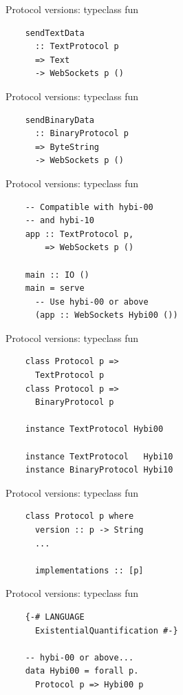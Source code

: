 \documentclass[20pt]{beamer}
\begin{document}
\begin{frame}[fragile]{Protocol versions: typeclass fun}
    \begin{lstlisting}
    sendTextData
      :: TextProtocol p
      => Text
      -> WebSockets p ()
    \end{lstlisting}
\end{frame}

\begin{frame}[fragile]{Protocol versions: typeclass fun}
    \begin{lstlisting}
    sendBinaryData
      :: BinaryProtocol p
      => ByteString
      -> WebSockets p ()
    \end{lstlisting}
\end{frame}

\begin{frame}[fragile]{Protocol versions: typeclass fun}
    \begin{lstlisting}
    -- Compatible with hybi-00
    -- and hybi-10
    app :: TextProtocol p,
        => WebSockets p ()

    main :: IO ()
    main = serve
      -- Use hybi-00 or above
      (app :: WebSockets Hybi00 ())
    \end{lstlisting}
\end{frame}

\begin{frame}[fragile]{Protocol versions: typeclass fun}
    \begin{lstlisting}
    class Protocol p =>
      TextProtocol p
    class Protocol p =>
      BinaryProtocol p

    instance TextProtocol Hybi00

    instance TextProtocol   Hybi10
    instance BinaryProtocol Hybi10
    \end{lstlisting}
\end{frame}

\begin{frame}[fragile]{Protocol versions: typeclass fun}
    \begin{lstlisting}
    class Protocol p where
      version :: p -> String
      ...

      implementations :: [p]
    \end{lstlisting}
\end{frame}

\begin{frame}[fragile]{Protocol versions: typeclass fun}
    \begin{lstlisting}
    {-# LANGUAGE
      ExistentialQuantification #-}

    -- hybi-00 or above...
    data Hybi00 = forall p.
      Protocol p => Hybi00 p
    \end{lstlisting}
\end{frame}
\end{document}
